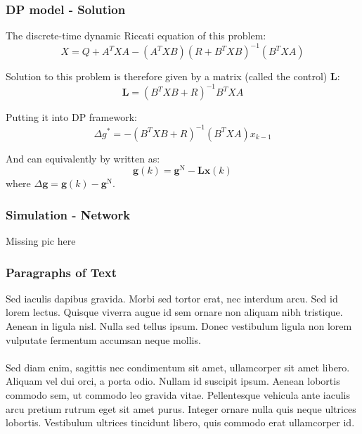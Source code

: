 \documentclass{beamer}
\begin{document}
\begin{frame}
\frametitle{DP model - Solution}
The discrete-time dynamic Riccati equation of this problem:
\begin{equation}
X = Q+ A ^ { T } X A - \left( A ^ { T } X B \right) \left( R + B ^ { T } X B \right) ^ { - 1 } \left( B ^ { T } X A \right)
\end{equation}

Solution to this problem is therefore given by a matrix (called the control) $\mathbf{L}$:
\begin{equation}
\mathbf{L} = \left(B ^ { T } X B +R \right) ^ { - 1 } B ^ { T } X A %
\end{equation}

Putting it into DP framework:
\begin{equation} 
\Delta g  ^ { * } = - \left( B ^ { T } X  B + R \right) ^ { - 1 } \left( B ^ { T } X  A \right) x _ { k - 1 }
\end{equation}

And can equivalently by written as:
\begin{equation} 
\mathbf { g } ( k ) = \mathbf { g } ^ { \mathrm { N } } - \mathbf { L } \mathbf { x } ( k )
\end{equation}
where $\Delta \mathbf {g } = \mathbf { g } ( k ) - \mathbf {g } ^ { \mathrm { N } }$.\\
\end{frame}



\begin{frame}
\frametitle{Simulation - Network}

Missing pic here
\end{frame}

\begin{frame}
\frametitle{Paragraphs of Text}
Sed iaculis dapibus gravida. Morbi sed tortor erat, nec interdum arcu. Sed id lorem lectus. Quisque viverra augue id sem ornare non aliquam nibh tristique. Aenean in ligula nisl. Nulla sed tellus ipsum. Donec vestibulum ligula non lorem vulputate fermentum accumsan neque mollis.\\~\\

Sed diam enim, sagittis nec condimentum sit amet, ullamcorper sit amet libero. Aliquam vel dui orci, a porta odio. Nullam id suscipit ipsum. Aenean lobortis commodo sem, ut commodo leo gravida vitae. Pellentesque vehicula ante iaculis arcu pretium rutrum eget sit amet purus. Integer ornare nulla quis neque ultrices lobortis. Vestibulum ultrices tincidunt libero, quis commodo erat ullamcorper id.
\end{frame}
\end{document}

